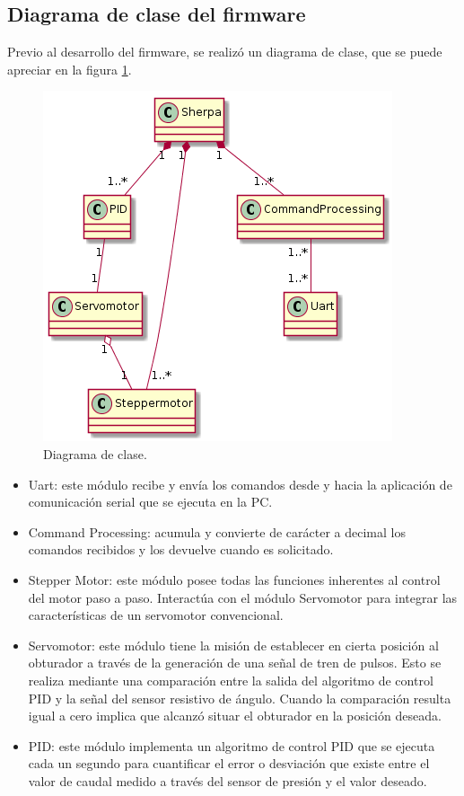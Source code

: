 \subsection{Diagrama de clase del firmware}
\label{subsec:Diagrama de clase}
Previo al desarrollo del firmware, se realizó un diagrama de clase, que se puede apreciar en la figura \ref{fig:Diagrama de clase.}. 
\begin{figure}[h]
	\centering
	\includegraphics[scale=.75]{./Figures/DiagramaDeClase-DistribucionDeAgua.png}
	\caption{Diagrama de clase.}
	\label{fig:Diagrama de clase.}
	\end{figure}
\begin{itemize}

\item Uart: este módulo recibe y envía los comandos desde y hacia la aplicación de comunicación serial que se ejecuta en la PC.

\item Command Processing: acumula y convierte de carácter a decimal los comandos recibidos y los devuelve cuando es solicitado.

\item Stepper Motor: este módulo posee todas las funciones inherentes al control del motor paso a paso. Interactúa con el módulo Servomotor para integrar las características de un servomotor convencional. 

\item Servomotor: este módulo tiene la misión de establecer en cierta posición al obturador a través de la generación de una señal de tren de pulsos. Esto se realiza mediante una comparación entre la salida del algoritmo de control PID y la señal del sensor resistivo de ángulo. Cuando la comparación resulta igual a cero implica que alcanzó situar el obturador en la posición deseada.

\item PID: este módulo implementa un algoritmo de control PID que se ejecuta cada un segundo para cuantificar el error o desviación que existe entre el valor de caudal medido a través del sensor de presión y el valor deseado.
\end{itemize}

